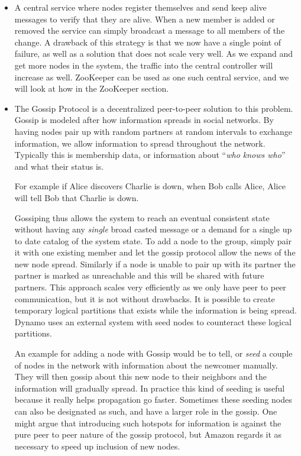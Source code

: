 \begin{itemize}
\item A central service where nodes register themselves and send keep alive messages to verify that they are alive. When a new member is added or removed the service can simply broadcast a message to all members of the change. A drawback of this strategy is that we now have a single point of failure, as well as a solution that does not scale very well. As we expand and get more nodes in the system, the traffic into the central controller will increase as well. ZooKeeper can be used as one such central service, and we will look at how in the ZooKeeper section.
\item The Gossip Protocol is a decentralized peer-to-peer solution to this problem. Gossip is modeled after how information spreads in social networks. By having nodes pair up with random partners at random intervals to exchange information, we allow information to spread throughout the network. Typically this is membership data, or information about ``\emph{who knows who}'' and what their status is.

For example if Alice discovers Charlie is down, when Bob calls Alice, Alice will tell Bob that Charlie is down.

Gossiping thus allows the system to reach an eventual consistent state without having any \emph{single} broad casted message or a demand for a single up to date catalog of the system state. To add a node to the group, simply pair it with one existing member and let the gossip protocol allow the news of the new node spread. Similarly if a node is unable to pair up with its partner the partner is marked as unreachable and this will be shared with future partners. This approach scales very efficiently as we only have peer to peer communication, but it is not without drawbacks. It is possible to create temporary logical partitions that exists while the information is being spread. Dynamo uses an external system with seed nodes to counteract these logical partitions. 

An example for adding a node with Gossip would be to tell, or \emph{seed} a couple of nodes in the network with information about the newcomer manually. They will then gossip about this new node to their neighbors and the information will gradually spread. In practice this kind of seeding is useful because it really helps propagation go faster. Sometimes these seeding nodes can also be designated as such, and have a larger role in the gossip. One might argue that introducing such hotspots for information is against the pure peer to peer nature of the gossip protocol, but Amazon regards it as necessary to speed up inclusion of new nodes.


\end{itemize}
